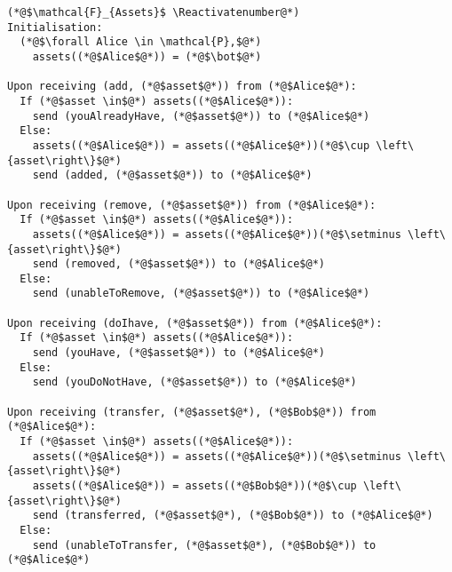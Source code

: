 \Suppressnumber
\begin{lstlisting}[label=assetsfunc, style=numbers]
(*@$\mathcal{F}_{Assets}$ \Reactivatenumber@*)
Initialisation:
  (*@$\forall Alice \in \mathcal{P},$@*)
    assets((*@$Alice$@*)) = (*@$\bot$@*)

Upon receiving (add, (*@$asset$@*)) from (*@$Alice$@*):
  If (*@$asset \in$@*) assets((*@$Alice$@*)):
    send (youAlreadyHave, (*@$asset$@*)) to (*@$Alice$@*)
  Else:
    assets((*@$Alice$@*)) = assets((*@$Alice$@*))(*@$\cup \left\{asset\right\}$@*)
    send (added, (*@$asset$@*)) to (*@$Alice$@*)

Upon receiving (remove, (*@$asset$@*)) from (*@$Alice$@*):
  If (*@$asset \in$@*) assets((*@$Alice$@*)):
    assets((*@$Alice$@*)) = assets((*@$Alice$@*))(*@$\setminus \left\{asset\right\}$@*)
    send (removed, (*@$asset$@*)) to (*@$Alice$@*)
  Else:
    send (unableToRemove, (*@$asset$@*)) to (*@$Alice$@*)

Upon receiving (doIhave, (*@$asset$@*)) from (*@$Alice$@*):
  If (*@$asset \in$@*) assets((*@$Alice$@*)):
    send (youHave, (*@$asset$@*)) to (*@$Alice$@*)
  Else:
    send (youDoNotHave, (*@$asset$@*)) to (*@$Alice$@*)

Upon receiving (transfer, (*@$asset$@*), (*@$Bob$@*)) from (*@$Alice$@*):
  If (*@$asset \in$@*) assets((*@$Alice$@*)):
    assets((*@$Alice$@*)) = assets((*@$Alice$@*))(*@$\setminus \left\{asset\right\}$@*)
    assets((*@$Alice$@*)) = assets((*@$Bob$@*))(*@$\cup \left\{asset\right\}$@*)
    send (transferred, (*@$asset$@*), (*@$Bob$@*)) to (*@$Alice$@*)
  Else:
    send (unableToTransfer, (*@$asset$@*), (*@$Bob$@*)) to (*@$Alice$@*)
\end{lstlisting}

